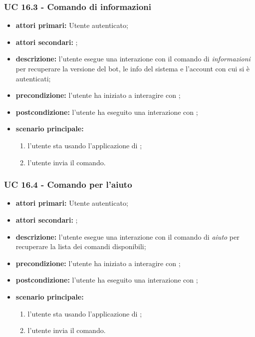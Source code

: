	\subsubsection{UC 16.3 - Comando di informazioni}

	\begin{itemize}
		\item \textbf{attori primari:} Utente autenticato;
		\item \textbf{attori secondari:} ;
		\item \textbf{descrizione:} l'utente esegue una interazione con il comando di \textit{informazioni} per recuperare la versione del bot, le info del sistema e l'account con cui si è autenticati;
		\item \textbf{precondizione:} l'utente ha iniziato a interagire con ;
		\item \textbf{postcondizione:} l'utente ha eseguito una interazione con ;
		\item \textbf{scenario principale:}
		\begin{enumerate}
			\item l'utente sta usando l'applicazione di ; 
			\item l'utente invia il comando.
		\end{enumerate}
	\end{itemize}



	\subsubsection{UC 16.4 - Comando per l'aiuto}


	\begin{itemize}
		\item \textbf{attori primari:} Utente autenticato;
		\item \textbf{attori secondari:} ;
		\item \textbf{descrizione:} l'utente esegue una interazione con il comando di \textit{aiuto} per recuperare la lista dei comandi disponibili;
		\item \textbf{precondizione:} l'utente ha iniziato a interagire con ;
		\item \textbf{postcondizione:} l'utente ha eseguito una interazione con ;
		\item \textbf{scenario principale:}
		\begin{enumerate}
			\item l'utente sta usando l'applicazione di ; 
			\item l'utente invia il comando.
		\end{enumerate}
	\end{itemize}


